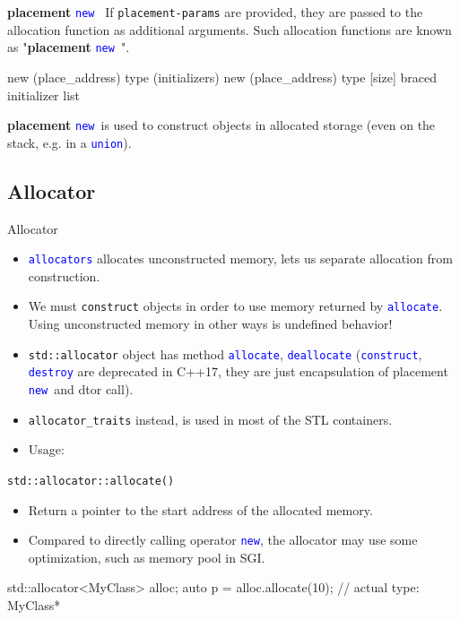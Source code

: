 \documentclass{beamer}
\newcommand{\blue}[1]{\textcolor{blue}{#1}}
\renewcommand{\bf}[1]{\textbf{#1}}
\newcommand{\ttt}[1]{\texttt{#1}}
\newcommand{\bluett}[1]{\blue{\ttt{#1}}}
\newcommand{\new}{\bluett{new}~}
\begin{document}
\begin{frame}[fragile]{\bf{placement} \new}
    If \ttt{placement-params} are provided, they are passed to the allocation function as additional arguments. Such allocation functions are known as "\bf{placement} \new".\\\begin{cpp}
new (place_address) type (initializers)
new (place_address) type [size] {braced initializer list}
    \end{cpp}
    \bf{placement} \new is used to construct objects in allocated storage (even on the stack, e.g. in a \bluett{union}).
\end{frame}

\subsection{Allocator}

\begin{frame}[fragile]{Allocator}
    \begin{itemize}
        \item \bluett{allocators} allocates unconstructed memory, lets us separate allocation from construction.
        \item We must \ttt{construct} objects in order to use memory returned by
        \bluett{allocate}. Using unconstructed memory in other ways is undefined behavior!
        \item \ttt{std::allocator} object has method \bluett{allocate}, \bluett{deallocate} (\bluett{construct}, \bluett{destroy} are deprecated in C++17, they are just encapsulation of placement \new and dtor call).
        \item \ttt{allocator\_traits} instead, is used in most of the STL containers.
        \item Usage:
    \end{itemize}
\end{frame}

\begin{frame}[fragile]{\ttt{std::allocator::allocate()}}
    \begin{itemize}
        \item Return a pointer to the start address of the allocated memory.
        \item Compared to directly calling operator \bluett{new}, the allocator may use some optimization, such as memory pool in SGI.
    \end{itemize}
    \begin{cpp}
        std::allocator<MyClass> alloc;
        auto p = alloc.allocate(10); // actual type: MyClass*
    \end{cpp}
\end{frame}
\end{document}
